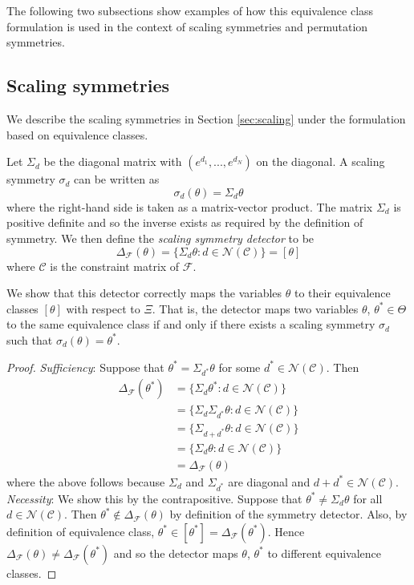 The following two subsections show examples of how this equivalence class formulation is used in the context of scaling symmetries and permutation symmetries.


\subsection{Scaling symmetries}

We describe the scaling symmetries in Section \ref{sec:scaling} under the formulation based on equivalence classes.

\begin{defn}
Let $\Sigma_d$ be the diagonal matrix with $(e^{d_1},...,e^{d_N})$ on the diagonal. A scaling symmetry $\sigma_d$ can be written as
\[
\sigma_d(\theta)=\Sigma_d\theta
\]
where the right-hand side is taken as a matrix-vector product. The matrix $\Sigma_d$ is positive definite and so the inverse exists as required by the definition of symmetry. We then define the \textit{scaling symmetry detector} to be
\[
\Delta_\mathcal{F}(\theta) = \{\Sigma_d\theta:d\in\mathcal{N}(\mathcal{C})\}=[\theta]
\]
where $\mathcal{C}$ is the constraint matrix of $\mathcal{F}$.
\end{defn}

\noindent We show that this detector correctly maps the variables $\theta$ to their equivalence classes $[\theta]$ with respect to $\Xi$. That is, the detector maps two variables $\theta$, $\theta^*\in\Theta$ to the same equivalence class if and only if there exists a scaling symmetry $\sigma_d$ such that $\sigma_d(\theta)=\theta^*$.

\begin{proof}
\textit{Sufficiency}: Suppose that $\theta^*=\Sigma_{d^*}\theta$ for some $d^*\in\mathcal{N}(\mathcal{C})$. Then
\begin{align*}
\Delta_\mathcal{F}(\theta^*) &= \{\Sigma_d\theta^*:d\in\mathcal{N}(\mathcal{C})\} \\
&= \{\Sigma_d\Sigma_{d^*}\theta:d\in\mathcal{N}(\mathcal{C})\} \\
&= \{\Sigma_{d+d^*}\theta:d\in\mathcal{N}(\mathcal{C})\} \\
&= \{\Sigma_d\theta:d\in\mathcal{N}(\mathcal{C})\} \\
&= \Delta_\mathcal{F}(\theta)
\end{align*}
where the above follows because $\Sigma_d$ and $\Sigma_{d^*}$ are diagonal and $d+d^*\in\mathcal{N}(\mathcal{C})$.
\\

\noindent \textit{Necessity}: We show this by the contrapositive. Suppose that $\theta^*\neq\Sigma_{d}\theta$ for all $d\in\mathcal{N}(\mathcal{C})$. Then $\theta^*\notin\Delta_\mathcal{F}(\theta)$ by definition of the symmetry detector. Also, by definition of equivalence class, $\theta^*\in[\theta^*]=\Delta_\mathcal{F}(\theta^*)$. Hence $\Delta_\mathcal{F}(\theta)\neq\Delta_\mathcal{F}(\theta^*)$ and so the detector maps $\theta$, $\theta^*$ to different equivalence classes.
\end{proof}

